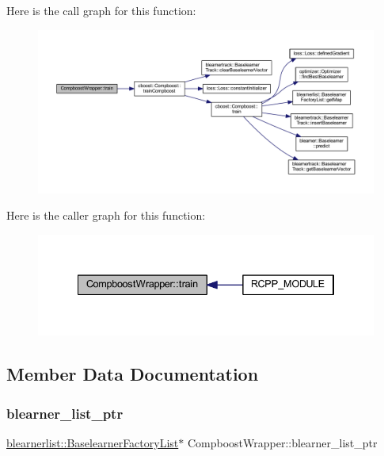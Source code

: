 Here is the call graph for this function\+:\nopagebreak
\begin{figure}[H]
\begin{center}
\leavevmode
\includegraphics[width=350pt]{class_compboost_wrapper_a361e455353ee08273d41ed7b8350881d_cgraph}
\end{center}
\end{figure}
Here is the caller graph for this function\+:\nopagebreak
\begin{figure}[H]
\begin{center}
\leavevmode
\includegraphics[width=334pt]{class_compboost_wrapper_a361e455353ee08273d41ed7b8350881d_icgraph}
\end{center}
\end{figure}


\subsection{Member Data Documentation}
\mbox{\label{class_compboost_wrapper_a5d1fea41a647ecda26106d7fb29b63eb}} 
\subsubsection{\texorpdfstring{blearner\+\_\+list\+\_\+ptr}{blearner\_list\_ptr}}
{\footnotesize\ttfamily \mbox{\hyperlink{classblearnerlist_1_1_baselearner_factory_list}{blearnerlist\+::\+Baselearner\+Factory\+List}}$\ast$ Compboost\+Wrapper\+::blearner\+\_\+list\+\_\+ptr\hspace{0.3cm}{\ttfamily [private]}}

